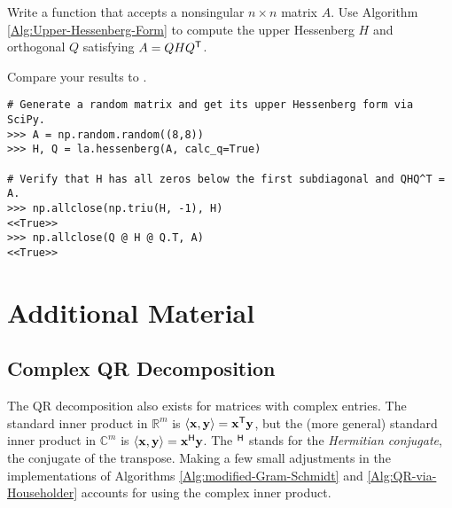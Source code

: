 \begin{problem} %
Write a function that accepts a nonsingular $n \times n$ matrix $A$.
Use Algorithm \ref{Alg:Upper-Hessenberg-Form} to compute the upper Hessenberg $H$ and orthogonal $Q$ satisfying $A = QHQ^{\mathsf T}$.

Compare your results to .

\begin{lstlisting}
# Generate a random matrix and get its upper Hessenberg form via SciPy.
>>> A = np.random.random((8,8))
>>> H, Q = la.hessenberg(A, calc_q=True)

# Verify that H has all zeros below the first subdiagonal and QHQ^T = A.
>>> np.allclose(np.triu(H, -1), H)
<<True>>
>>> np.allclose(Q @ H @ Q.T, A)
<<True>>
\end{lstlisting}
\label{prob:hessenberg-via-householder}
\end{problem}

\newpage

\section*{Additional Material} %

\subsection*{Complex QR Decomposition} %

The QR decomposition also exists for matrices with complex entries.
The standard inner product in $\mathbb{R}^m$ is $\langle \mathbf{x},\mathbf{y} \rangle = \mathbf{x}^{\mathsf T} \mathbf{y}$, but the (more general) standard inner product in $\mathbb{C}^m$ is $\langle \mathbf{x},\mathbf{y} \rangle = \mathbf{x}^{\mathsf H} \mathbf{y}$.
The $^{\mathsf H}$ stands for the \emph{Hermitian conjugate}, the conjugate of the transpose.
Making a few small adjustments in the implementations of Algorithms \ref{Alg:modified-Gram-Schmidt} and \ref{Alg:QR-via-Householder} accounts for using the complex inner product.


